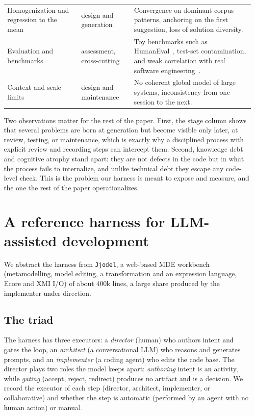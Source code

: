 \documentclass[sigconf]{acmart}
\begin{document}
\begin{table}[t]
\begin{tabularx}{\textwidth}{@{}p{2.9cm}p{3.1cm}X@{}}
Homogenization and regression to the mean & design and generation & Convergence on dominant corpus patterns, anchoring on the first suggestion, loss of solution diversity. \\
Evaluation and benchmarks & assessment, cross-cutting & Toy benchmarks such as HumanEval~\cite{chen2021codex}, test-set contamination, and weak correlation with real software engineering~\cite{hou2024llm4se}. \\
Context and scale limits & design and maintenance & No coherent global model of large systems, inconsistency from one session to the next. \\
\bottomrule
\end{tabularx}
\end{table}

Two observations matter for the rest of the paper. First, the stage column shows that several problems are born at generation but become visible only later, at review, testing, or maintenance, which is exactly why a disciplined process with explicit review and recording steps can intercept them. Second, knowledge debt and cognitive atrophy stand apart: they are not defects in the code but in what the process fails to internalize, and unlike technical debt they escape any code-level check. This is the problem our harness is meant to expose and measure, and the one the rest of the paper operationalizes.

\section{A reference harness for LLM-assisted development}
We abstract the harness from \texttt{Jjodel}, a web-based MDE workbench (metamodelling, model editing, a transformation and an expression language, Ecore and XMI I/O) of about 400k lines, a large share produced by the implementer under direction.

\subsection{The triad}
The harness has three executors: a \emph{director} (human) who authors intent and gates the loop, an \emph{architect} (a conversational LLM) who reasons and generates prompts, and an \emph{implementer} (a coding agent) who edits the code base. The director plays two roles the model keeps apart: \emph{authoring} intent is an activity, while \emph{gating} (accept, reject, redirect) produces no artifact and is a decision. We record the executor of each step (director, architect, implementer, or collaborative) and whether the step is automatic (performed by an agent with no human action) or manual.
\end{document}
